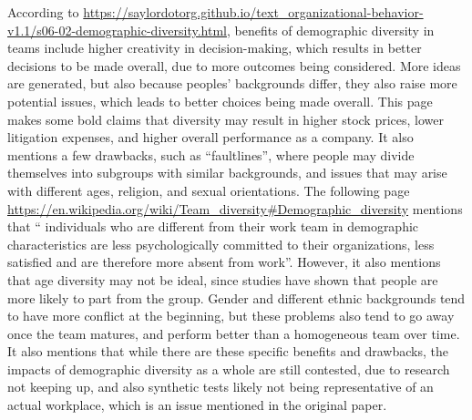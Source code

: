 \documentclass[letterpaper,12pt]{article}
\begin{document}
According to \url{https://saylordotorg.github.io/text_organizational-behavior-v1.1/s06-02-demographic-diversity.html},
benefits of demographic diversity in teams include higher creativity in 
decision-making, which results in
better decisions to be made overall, due to more outcomes being considered. More ideas are generated, but also
because peoples' backgrounds differ, they also raise more potential issues, which leads to better choices being made overall.
This page makes some bold claims that diversity may result in higher stock prices, lower litigation expenses, and higher overall performance as a company. It also mentions a few drawbacks, such as ``faultlines'', where people may divide themselves
into subgroups with similar backgrounds, and issues that may arise with different ages, religion, and sexual orientations.
The following page \url{https://en.wikipedia.org/wiki/Team_diversity#Demographic_diversity} mentions that
`` individuals who are different from their work team in demographic characteristics are less psychologically committed to their organizations, less satisfied and are therefore more absent from work''. However, it also mentions that age diversity may not be
ideal, since studies have shown that people are more likely to part from the group. Gender and different ethnic backgrounds
tend to have more conflict at the beginning, but these problems also tend to go away once the team matures, and perform better
than a homogeneous team over time. It also mentions that while there are these specific benefits and drawbacks, the impacts
of demographic diversity as a whole are still contested, due to research not keeping up, and also synthetic tests
likely not being representative of an actual workplace, which is an issue mentioned in the original paper.
\end{document}
